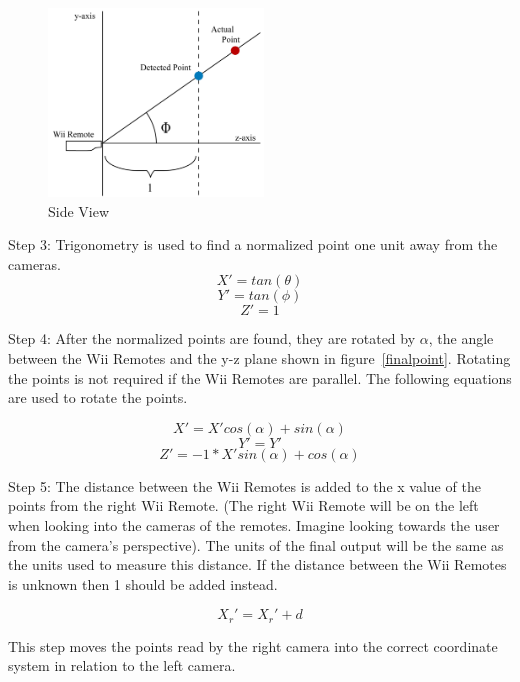 \documentclass[a4paper,twoside]{article}
\begin{document}
\begin{indenteddescription}
\begin{figure}[t] \begin{center} \includegraphics[height =
5cm]{Diagram2_CalcSideView.png} \end{center} \caption{Side View}
\label{sideview} \end{figure}

\item[Step 3:] Trigonometry is used to find a normalized point one unit away from
the cameras.  \begin{equation}\label{eq1} X' = tan(\theta) \end{equation}
\begin{equation}\label{eq2} Y' = tan(\phi)  \end{equation}
\begin{equation}\label{eq3} Z' = 1          \end{equation}

\item[Step 4:] After the normalized points are found, they are rotated by
$\alpha$, the angle between the Wii Remotes and the y-z plane shown in
figure~\ref{finalpoint}. Rotating the points is not required if the Wii Remotes
are parallel. The following equations are used to rotate the points. 

\begin{flushleft} \begin{equation}\label{eq4} X' = X'cos(\alpha) + sin(\alpha)
\end{equation} \begin{equation}\label{eq5} Y' = Y'\end{equation}
\begin{equation}\label{eq6} Z' = -1 * X'sin(\alpha) + cos(\alpha)\end{equation}
\end{flushleft}


\item[Step 5:] The distance between the Wii Remotes is added to the x value of
the points from the right Wii Remote. (The right Wii Remote will be on the left
when looking into the cameras of the remotes. Imagine looking towards the user
from the camera's perspective). The units of the final output will be the same
as the units used to measure this distance. If the distance between the Wii
Remotes is unknown then 1 should be added instead.

\begin{equation}\label{eq7} X_{r}' = X_{r}' + d \end{equation}

This step moves the points read by the right camera into the correct coordinate
system in relation to the left camera.  \end{indenteddescription}
\end{document}
